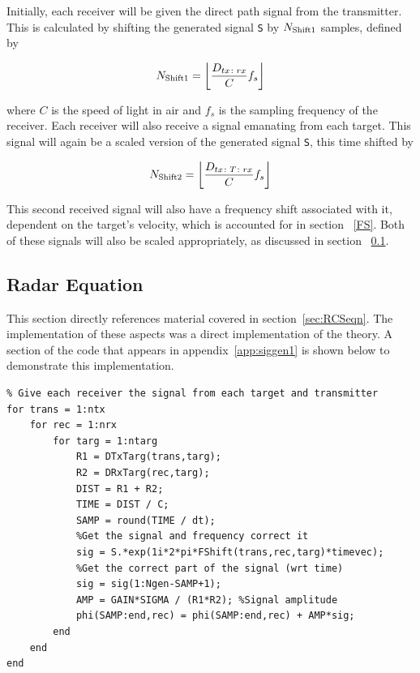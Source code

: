 \documentclass[12pt,openany,a4paper]{book}
\begin{document}
\bigskip

Initially, each receiver will be given the direct path signal from the transmitter. This is calculated by shifting the generated signal \verb+S+ by $N_{\textnormal{Shift1}}$ samples, defined by

\begin{equation}
N_{\textnormal{Shift1}} =
\bigg\lfloor  \frac{D_{tx\colon rx}}{C} f_s \bigg\rfloor
\end{equation}

\bigskip

where $C$ is the speed of light in air and $f_s$ is the sampling frequency of the receiver. Each receiver will also receive a signal emanating from each target. This signal will again be a scaled version of the generated signal \verb+S+, this time shifted by

\begin{equation}
N_{\textnormal{Shift2}} =
\bigg\lfloor  \frac{D_{tx\colon T\colon rx}}{C} f_s \bigg\rfloor
\end{equation}

\bigskip

This second received signal will also have a frequency shift associated with it, dependent on the target's velocity, which is accounted for in section ~\ref{FS}. Both of these signals will also be scaled appropriately, as discussed in section ~\ref{RE}.

\subsection{Radar Equation}
\label{RE}
This section directly references material covered in section~\ref{sec:RCSeqn}. The implementation of these aspects was a direct implementation of the theory. A section of the code that appears in appendix~\ref{app:siggen1} is shown below to demonstrate this implementation.


\begin{verbatim}
% Give each receiver the signal from each target and transmitter
for trans = 1:ntx
    for rec = 1:nrx
        for targ = 1:ntarg
            R1 = DTxTarg(trans,targ);
            R2 = DRxTarg(rec,targ);
            DIST = R1 + R2;
            TIME = DIST / C;
            SAMP = round(TIME / dt);
            %Get the signal and frequency correct it
            sig = S.*exp(1i*2*pi*FShift(trans,rec,targ)*timevec);
            %Get the correct part of the signal (wrt time)
            sig = sig(1:Ngen-SAMP+1); 
            AMP = GAIN*SIGMA / (R1*R2); %Signal amplitude
            phi(SAMP:end,rec) = phi(SAMP:end,rec) + AMP*sig;
        end
    end
end
\end{verbatim}
\end{document}
